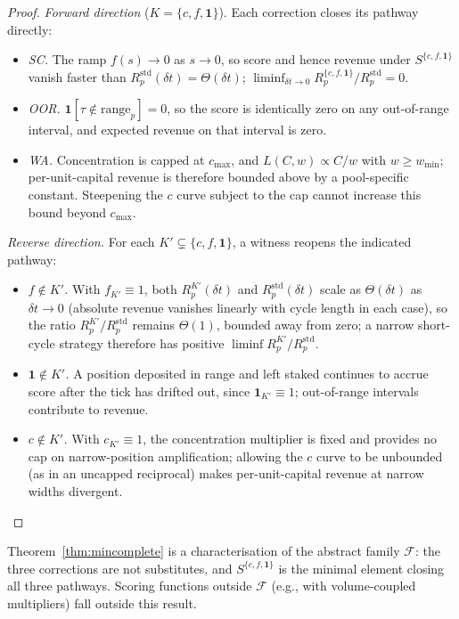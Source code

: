 \documentclass[11pt,a4paper]{article}
\theoremstyle{cgdefinition}
\theoremstyle{cgplain}
\theoremstyle{cgremark}
\begin{document}
\begin{proof}
\emph{Forward direction} ($K = \{c, f, \mathbf{1}\}$). Each correction closes its pathway directly:
\begin{itemize}[leftmargin=2em,nosep]
\item \emph{SC.} The ramp $f(s) \to 0$ as $s \to 0$, so score and hence revenue under $S^{\{c,f,\mathbf{1}\}}$ vanish faster than $R^{\text{std}}_p(\delta t) = \Theta(\delta t)$; $\liminf_{\delta t \to 0} R^{\{c,f,\mathbf{1}\}}_p/R^{\text{std}}_p = 0$.
\item \emph{OOR.} $\mathbf{1}[\tau \notin \text{range}_p] = 0$, so the score is identically zero on any out-of-range interval, and expected revenue on that interval is zero.
\item \emph{WA.} Concentration is capped at $c_{\max}$, and $L(C, w) \propto C/w$ with $w \geq w_{\min}$; per-unit-capital revenue is therefore bounded above by a pool-specific constant. Steepening the $c$ curve subject to the cap cannot increase this bound beyond $c_{\max}$.
\end{itemize}

\emph{Reverse direction.} For each $K' \subsetneq \{c, f, \mathbf{1}\}$, a witness reopens the indicated pathway:
\begin{itemize}[leftmargin=2em,nosep]
\item \emph{$f \notin K'$.} With $f_{K'} \equiv 1$, both $R^{K'}_p(\delta t)$ and $R^{\text{std}}_p(\delta t)$ scale as $\Theta(\delta t)$ as $\delta t \to 0$ (absolute revenue vanishes linearly with cycle length in each case), so the ratio $R^{K'}_p/R^{\text{std}}_p$ remains $\Theta(1)$, bounded away from zero; a narrow short-cycle strategy therefore has positive $\liminf R^{K'}_p/R^{\text{std}}_p$.
\item \emph{$\mathbf{1} \notin K'$.} A position deposited in range and left staked continues to accrue score after the tick has drifted out, since $\mathbf{1}_{K'} \equiv 1$; out-of-range intervals contribute to revenue.
\item \emph{$c \notin K'$.} With $c_{K'} \equiv 1$, the concentration multiplier is fixed and provides no cap on narrow-position amplification; allowing the $c$ curve to be unbounded (as in an uncapped reciprocal) makes per-unit-capital revenue at narrow widths divergent.
\end{itemize}
\end{proof}

Theorem~\ref{thm:mincomplete} is a characterisation of the abstract family $\mathcal{F}$: the three corrections are not substitutes, and $S^{\{c, f, \mathbf{1}\}}$ is the minimal element closing all three pathways. Scoring functions outside $\mathcal{F}$ (e.g., with volume-coupled multipliers) fall outside this result.
\end{document}
